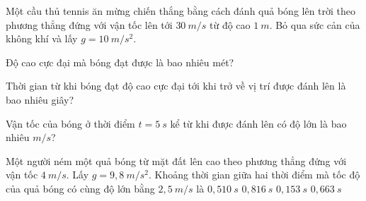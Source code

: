 \begin{vidu}%
Một cầu thủ tennis ăn mừng chiến thắng bằng cách đánh quả bóng lên trời theo phương thẳng đứng với vận tốc lên tới $30\ m/s$ từ độ cao $1\ m$. Bỏ qua sức cản của không khí và lấy $g=10\ m/s^2$.
\begin{vdc}
Độ cao cực đại mà bóng đạt được là bao nhiêu mét? 
\end{vdc}
\begin{vdc}
Thời gian từ khi bóng đạt độ cao cực đại tới khi trở về vị trí được đánh lên là bao nhiêu giây?
\end{vdc}

\begin{vdc}
Vận tốc của bóng ở thời điểm $t=5\ s$ kể từ khi được đánh lên có độ lớn là bao nhiêu $m/s$?
\end{vdc}
\end{vidu}	
\begin{vidu} %
Một người ném một quả bóng từ mặt đất lên cao theo phương thẳng đứng với vận tốc $4\  m/s$. Lấy $g = 9,8\  m/s^ 2$. Khoảng thời gian giữa hai thời điểm mà tốc độ của quả bóng có cùng độ lớn bằng $2,5\  m/s$ là
\choice
{\True $0,510\ s$}
{$0,816\ s$}
{$0,153\ s$}
{$0,663\ s$}
\end{vidu}
